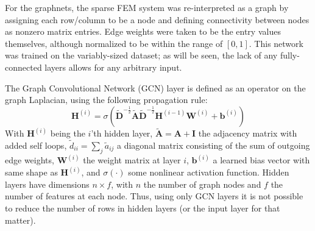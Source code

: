 \documentclass[review]{siamart190516}
\newcommand{\mat}[1]{\bm{{#1}}}
\renewcommand{\vec}[1]{\bm{{#1}}}
\begin{document}
For the graphnets, the sparse FEM system was re-interpreted as a graph by assigning each row/column to be a node and defining connectivity between nodes as nonzero matrix entries.  Edge weights were taken to be the entry values themselves, although normalized to be within the range of $[0, 1]$.   This network was trained on the variably-sized dataset; as will be seen, the lack of any fully-connected layers allows for any arbitrary input.

The Graph Convolutional Network (GCN) layer is defined as an operator on the graph Laplacian, using the following propagation rule:
\begin{equation}
  \mat{H}^{\left(i\right)} = \sigma\left( \mat{\tilde{D}}^{-\frac{1}{2}} \mat{\tilde{A}} \mat{\tilde{D}}^{-\frac{1}{2}} \mat{H}^{\left(i-1\right)} \mat{W}^{\left(i\right)} + \vec{b}^{(i)} \right)
\end{equation}
With $\mat{H}^{\left(i\right)}$ being the $i$'th hidden layer, $\mat{\tilde{A}} = \mat{A} + \mat{I}$ the adjacency matrix with added self loops, $\tilde{d}_{ii}=\sum_j\tilde{a}_{ij}$ a diagonal matrix consisting of the sum of outgoing edge weights, $\mat{W}^{(i)}$ the weight matrix at layer $i$, $\vec{b}^{(i)}$ a learned bias vector with same shape as $\mat{H}^{(i)}$, and $\sigma\left(\cdot\right)$ some nonlinear activation function.  Hidden layers have dimensions $n \times f$, with $n$ the number of graph nodes and $f$ the number of features at each node.  Thus, using only GCN layers it is not possible to reduce the number of rows in hidden layers (or the input layer for that matter).
\end{document}

